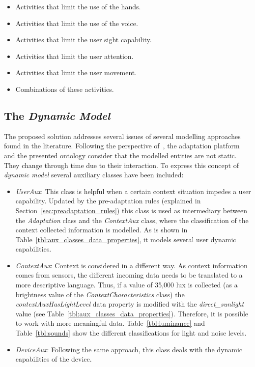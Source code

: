 \begin{itemize}
 \item Activities that limit the use of the hands.
 \item Activities that limit the use of the voice.
 \item Activities that limit the user sight capability.
 \item Activities that limit the user attention.
 \item Activities that limit the user movement.
 \item Combinations of these activities.
\end{itemize}

\subsection{The \textit{Dynamic Model}}
\label{sec:dynamic_model}

The proposed solution addresses several issues of several modelling approaches
found in the literature. Following the perspective of~\citet{fischer_user_2001},
the adaptation platform and the presented ontology consider that the modelled 
entities are not static. They change through time due to their interaction. To 
express this concept of \textit{dynamic model} several auxiliary classes have been
included:

\begin{itemize}
 \item \textit{UserAux}: This class is helpful when a certain context situation
 impedes a user capability. Updated by the pre-adaptation rules (explained
 in Section~\ref{sec:preadaptation_rules}) this class is used as intermediary 
 between the \textit{Adaptation} class and the \textit{ContextAux} class, where 
 the classification of the context collected information is modelled. As is 
 shown in Table~\ref{tbl:aux_classes_data_properties}, it models several user
 dynamic capabilities.
 
 \item \textit{ContextAux}: Context is considered in a different way. As context
 information comes from sensors, the different incoming data needs to be translated
 to a more descriptive language. Thus, if a value of 35,000 lux is collected (as
 a brightness value of the \textit{ContextCharacteristics} class) the
 \textit{contextAuxHasLightLevel} data property is modified with the \textit{direct\_sunlight} 
 value (see Table~\ref{tbl:aux_classes_data_properties}). Therefore, it is possible to work
 with more meaningful data. Table~\ref{tbl:luminance} and Table~\ref{tbl:sounds} 
 show the different classifications for light and noise levels.
 
 \item \textit{DeviceAux}: Following the same approach, this class deals with the
 dynamic capabilities of the device.
\end{itemize}

